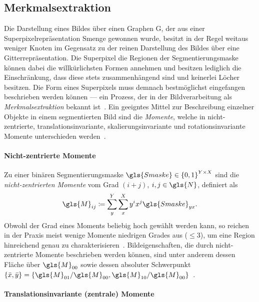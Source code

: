 \subsection{Merkmalsextraktion}
\label{merkmalsextraktion}

Die Darstellung eines Bildes über einen Graphen \gls{G}, der aus einer Superpixelrepräsentation \gls{Smenge} gewonnen wurde, besitzt in der Regel weitaus weniger Knoten im Gegensatz zu der reinen Darstellung des Bildes über eine Gitterrepräsentation.
Die Superpixel \bzw{} die Regionen der Segmentierungsmaske können dabei die willkürlichsten Formen annehmen und besitzen lediglich die Einschränkung, dass diese stets zusammenhängend sind und keinerlei Löcher besitzen.
Die Form eines Superpixels muss demnach bestmöglichst eingefangen \bzw{} beschrieben werden können — ein Prozess, der in der Bildverarbeitung als \emph{Merkmalsextraktion} bekannt ist~\cite{momente}.
Ein geeigntes Mittel zur Beschreibung einzelner Objekte in einem segmentierten Bild sind die \emph{Momente}, welche in nicht-zentrierte, translationsinvariante, skalierungsinvariante und rotationsinvariante Momente unterschieden werden~\cite{momente}.

\paragraph{Nicht-zentrierte Momente}
\label{nicht_zentrierte_momente}

Zu einer binären Segmentierungsmaske $\gls{Smaske} \in {\left\{0, 1\right\}}^{Y \times X}$ sind die \emph{nicht-zentrierten Momente} vom Grad $\left(i+j\right)$, $i,j\in\gls{N}$, definiert als~\cite{momente}
\begin{equation*}
  \gls{M}_{ij} \coloneqq \sum_y^Y \sum_x^X y^i x^j \gls{Smaske}_{yx}.
\end{equation*}
Obwohl der Grad eines Moments beliebig hoch gewählt werden kann, so reichen in der Praxis meist wenige Momente niedrigen Grades aus ($\le 3$), um eine Region hinreichend genau zu charakterisieren~\cite{momente}.
Bildeigenschaften, die durch nicht-zentrierte Momente beschrieben werden können, sind unter anderem dessen Fläche über $\gls{M}_{00}$ sowie dessen absoluter Schwerpunkt $\left\{\bar{x}, \bar{y}\right\} = \left\{ \gls{M}_{01}/\gls{M}_{00}, \gls{M}_{10}/\gls{M}_{00}\right\}$~\cite{momente}.

\paragraph{Translationsinvariante (zentrale) Momente}
\label{translationsinvariante_momente}

